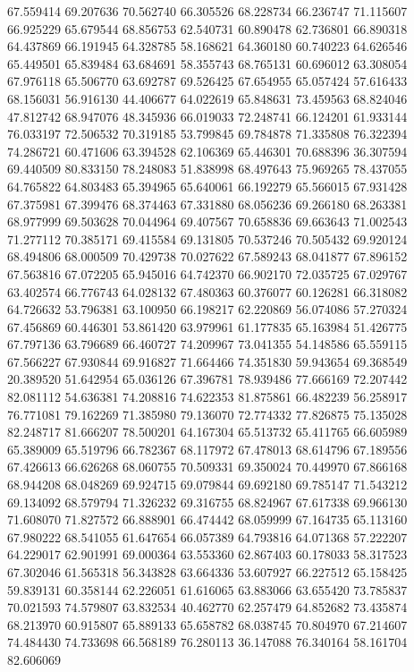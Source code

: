 67.559414
69.207636
70.562740
66.305526
68.228734
66.236747
71.115607
66.925229
65.679544
68.856753
62.540731
60.890478
62.736801
66.890318
64.437869
66.191945
64.328785
58.168621
64.360180
60.740223
64.626546
65.449501
65.839484
63.684691
58.355743
68.765131
60.696012
63.308054
67.976118
65.506770
63.692787
69.526425
67.654955
65.057424
57.616433
68.156031
56.916130
44.406677
64.022619
65.848631
73.459563
68.824046
47.812742
68.947076
48.345936
66.019033
72.248741
66.124201
61.933144
76.033197
72.506532
70.319185
53.799845
69.784878
71.335808
76.322394
74.286721
60.471606
63.394528
62.106369
65.446301
70.688396
36.307594
69.440509
80.833150
78.248083
51.838998
68.497643
75.969265
78.437055
64.765822
64.803483
65.394965
65.640061
66.192279
65.566015
67.931428
67.375981
67.399476
68.374463
67.331880
68.056236
69.266180
68.263381
68.977999
69.503628
70.044964
69.407567
70.658836
69.663643
71.002543
71.277112
70.385171
69.415584
69.131805
70.537246
70.505432
69.920124
68.494806
68.000509
70.429738
70.027622
67.589243
68.041877
67.896152
67.563816
67.072205
65.945016
64.742370
66.902170
72.035725
67.029767
63.402574
66.776743
64.028132
67.480363
60.376077
60.126281
66.318082
64.726632
53.796381
63.100950
66.198217
62.220869
56.074086
57.270324
67.456869
60.446301
53.861420
63.979961
61.177835
65.163984
51.426775
67.797136
63.796689
66.460727
74.209967
73.041355
54.148586
65.559115
67.566227
67.930844
69.916827
71.664466
74.351830
59.943654
69.368549
20.389520
51.642954
65.036126
67.396781
78.939486
77.666169
72.207442
82.081112
54.636381
74.208816
74.622353
81.875861
66.482239
56.258917
76.771081
79.162269
71.385980
79.136070
72.774332
77.826875
75.135028
82.248717
81.666207
78.500201
64.167304
65.513732
65.411765
66.605989
65.389009
65.519796
66.782367
68.117972
67.478013
68.614796
67.189556
67.426613
66.626268
68.060755
70.509331
69.350024
70.449970
67.866168
68.944208
68.048269
69.924715
69.079844
69.692180
69.785147
71.543212
69.134092
68.579794
71.326232
69.316755
68.824967
67.617338
69.966130
71.608070
71.827572
66.888901
66.474442
68.059999
67.164735
65.113160
67.980222
68.541055
61.647654
66.057389
64.793816
64.071368
57.222207
64.229017
62.901991
69.000364
63.553360
62.867403
60.178033
58.317523
67.302046
61.565318
56.343828
63.664336
53.607927
66.227512
65.158425
59.839131
60.358144
62.226051
61.616065
63.883066
63.655420
73.785837
70.021593
74.579807
63.832534
40.462770
62.257479
64.852682
73.435874
68.213970
60.915807
65.889133
65.658782
68.038745
70.804970
67.214607
74.484430
74.733698
66.568189
76.280113
36.147088
76.340164
58.161704
82.606069
